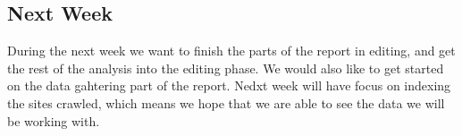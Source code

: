 \subsection*{Next Week}
During the next week we want to finish the parts of the report in editing, and
get the rest of the analysis into the editing phase. We would also like to get
started on the data gahtering part of the report. Nedxt week will have focus on
indexing the sites crawled, which means we hope that we are able to see the data
we will be working with.










% 
% 
% 
% 
% 
% 
% 
% 
% 
% 
% 
% 
% 
% 
% 

